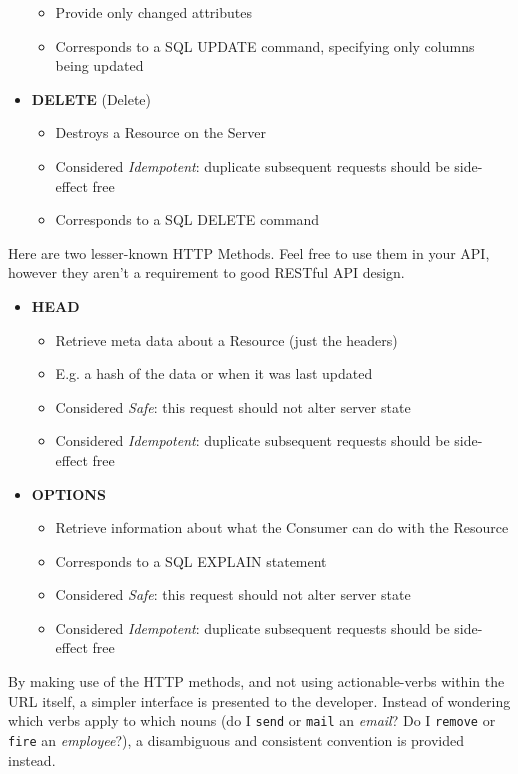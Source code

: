 \documentclass{book}
\begin{document}
\begin{itemize}
\begin{itemize}
    \item Provide only changed attributes
    \item Corresponds to a SQL UPDATE command, specifying only columns being updated
    \end{itemize}
\item \textbf{DELETE} (Delete)
    \begin{itemize}
    \item Destroys a Resource on the Server
    \item Considered \emph{Idempotent}: duplicate subsequent requests should be side-effect free
    \item Corresponds to a SQL DELETE command
    \end{itemize}
\end{itemize}

Here are two lesser-known HTTP Methods. Feel free to use them in your API, however they aren't a requirement to good RESTful API design.

\begin{itemize}
\item \textbf{HEAD}
    \begin{itemize}
    \item Retrieve meta data about a Resource (just the headers)
    \item E.g. a hash of the data or when it was last updated
    \item Considered \emph{Safe}: this request should not alter server state
    \item Considered \emph{Idempotent}: duplicate subsequent requests should be side-effect free
    \end{itemize}
\item \textbf{OPTIONS}
    \begin{itemize}
    \item Retrieve information about what the Consumer can do with the Resource
    \item Corresponds to a SQL EXPLAIN statement
    \item Considered \emph{Safe}: this request should not alter server state
    \item Considered \emph{Idempotent}: duplicate subsequent requests should be side-effect free
    \end{itemize}
\end{itemize}

By making use of the HTTP methods, and not using actionable-verbs within the URL itself, a simpler interface is presented to the developer. Instead of wondering which verbs apply to which nouns (do I \texttt{send} or \texttt{mail} an \emph{email}? Do I \texttt{remove} or \texttt{fire} an \emph{employee}?), a disambiguous and consistent convention is provided instead.
\end{document}
